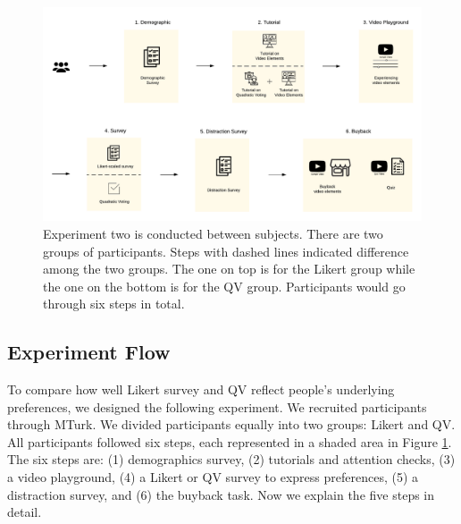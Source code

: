 

\begin{figure}[htpb]
    \centering
    \includegraphics[width=\textwidth, keepaspectratio=true]{content/image/new_exp2_flow.pdf}
    \caption{
        Experiment two is conducted between subjects. There are two groups of participants. Steps with dashed lines indicated difference among the two groups. The one on top is for the Likert group while the one on the bottom is for the QV group. Participants would go through six steps in total.
    }
    \label{fig:exp2_flow}
\end{figure}

\subsection{Experiment Flow}

To compare how well Likert survey and QV reflect people's underlying preferences, we designed the following experiment. We recruited participants through MTurk. We divided participants equally into two groups: Likert and QV. All participants followed six steps, each represented in a shaded area in Figure \ref{fig:exp2_flow}. The six steps are: (1) demographics survey, (2) tutorials and attention checks, (3) a video playground, (4) a Likert or QV survey to express preferences, (5) a distraction survey, and (6) the buyback task. Now we explain the five steps in detail.

